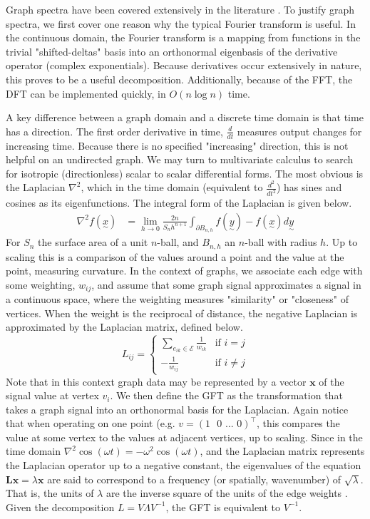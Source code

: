 \documentclass[12pt,a4paper]{article} %
\newcommand{\ve}[1]{\underset{\sim}{#1}}
\begin{document}
Graph spectra have been covered extensively in the literature \cite{moura}\cite{mand}. To justify graph spectra, we first cover one reason why the typical Fourier transform is useful. In the continuous domain, the Fourier transform is a mapping from functions in the trivial "shifted-deltas" basis into an orthonormal eigenbasis of the derivative operator (complex exponentials). Because derivatives occur extensively in nature, this proves to be a useful decomposition. Additionally, because of the FFT, the DFT can be implemented quickly, in $O(n\log n)$ time.

A key difference between a graph domain and a discrete time domain is that time has a direction. The first order derivative in time, $\frac{d}{dt}$ measures output changes for increasing time. Because there is no specified "increasing" direction, this is not helpful on an undirected graph. We may turn to multivariate calculus to search for isotropic (directionless) scalar to scalar differential forms. The most obvious is the Laplacian $\nabla^2$, which in the time domain (equivalent to $\frac{d^2}{dt^2}$) has sines and cosines as its eigenfunctions. The integral form of the Laplacian is given below.
\begin{align*}
    \nabla^2f(\ve{x})&=\lim_{h\to0}\frac{2n}{S_nh^{n+1}}\int_{\partial B_{n,h}}f(\ve{y})-f(\ve{x})d\ve{y}
\end{align*}
For $S_n$ the surface area of a unit $n$-ball, and $B_{n,h}$ an $n$-ball with radius $h$. Up to scaling this is a comparison of the values around a point and the value at the point, measuring curvature. In the context of graphs, we associate each edge with some weighting, $w_{ij}$, and assume that some graph signal approximates a signal in a continuous space, where the weighting measures "similarity" or "closeness" of vertices. When the weight is the reciprocal of distance, the negative Laplacian is approximated by the Laplacian matrix, defined below.
\[
    L_{ij}=\begin{cases}
        \sum_{e_{ik}\in\mathcal{E}}\frac{1}{w_{ik}}&\text{if }i=j\\
        -\frac{1}{w_{ij}}&\text{if }i\neq j
    \end{cases}
\]
Note that in this context graph data may be represented by a vector $\textbf{x}$ of the signal value at vertex $v_i$. We then define the GFT as the transformation that takes a graph signal into an orthonormal basis for the Laplacian. Again notice that when operating on one point (e.g. $v=(1\text{ }0\text{ ... }0)^\top$, this compares the value at some vertex to the values at adjacent vertices, up to scaling. Since in the time domain $\nabla^2\cos(\omega t)=-\omega^2\cos(\omega t)$, and the Laplacian matrix represents the Laplacian operator up to a negative constant, the eigenvalues of the equation $\mathbf{Lx}=\lambda\mathbf{x}$ are said to correspond to a frequency (or spatially, wavenumber) of $\sqrt{\lambda}$. That is, the units of $\lambda$ are the inverse square of the units of the edge weights \cite{mand}. Given the decomposition $L=V\Lambda V^{-1}$, the GFT is equivalent to $V^{-1}$.
\end{document}
